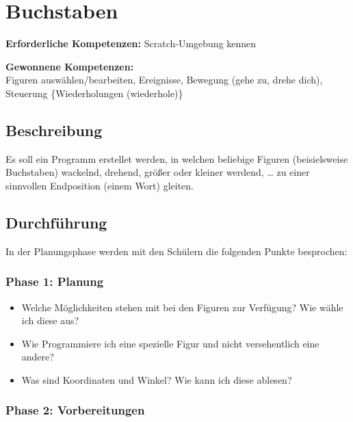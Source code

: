 \section{Buchstaben}\label{buchstaben}

\textbf{Erforderliche Kompetenzen:} Scratch-Umgebung kennen

\textbf{Gewonnene Kompetenzen:}\\
Figuren auswählen/bearbeiten, Ereignisse, Bewegung (gehe zu, drehe
dich), Steuerung \{Wiederholungen (wiederhole)\}

\begin{figure}[ht]
    \centering 
    \caption[\Sectionname]{\Sectionname}
\end{figure}

\subsection{Beschreibung}\label{beschreibung}

Es soll ein Programm erstellet werden, in welchen beliebige Figuren
(beisielsweise Buchstaben) wackelnd, drehend, größer oder kleiner
werdend, \ldots{} zu einer sinnvollen Endposition (einem Wort) gleiten.

\subsection{Durchführung}\label{durchfuxfchrung}

In der Planungsphase werden mit den Schülern die folgenden Punkte
besprochen:

\subsubsection{Phase 1: Planung}\label{phase-1-planung}

\begin{itemize}
\tightlist
\item
  Welche Möglichkeiten stehen mit bei den Figuren zur Verfügung? Wie
  wähle ich diese aus?
\item
  Wie Programmiere ich eine spezielle Figur und nicht versehentlich eine
  andere?
\item
  Was sind Koordinaten und Winkel? Wie kann ich diese ablesen?
\end{itemize}

\subsubsection{Phase 2: Vorbereitungen}\label{phase-2-vorbereitungen}

